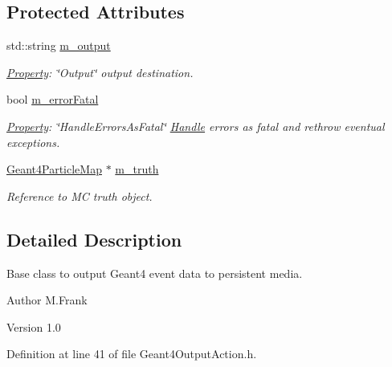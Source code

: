 \subsection*{Protected Attributes}
\begin{DoxyCompactItemize}
\item 
std::string \hyperlink{class_d_d4hep_1_1_simulation_1_1_geant4_output_action_ac3bd42351cc01a0e259cb5cc9641c6f4}{m\_\-output}
\begin{DoxyCompactList}\small\item\em \hyperlink{class_d_d4hep_1_1_property}{Property}: \char`\"{}Output\char`\"{} output destination. \item\end{DoxyCompactList}\item 
bool \hyperlink{class_d_d4hep_1_1_simulation_1_1_geant4_output_action_a7d76cce37c53f07c27f41a887fc05dbe}{m\_\-errorFatal}
\begin{DoxyCompactList}\small\item\em \hyperlink{class_d_d4hep_1_1_property}{Property}: \char`\"{}HandleErrorsAsFatal\char`\"{} \hyperlink{class_d_d4hep_1_1_handle}{Handle} errors as fatal and rethrow eventual exceptions. \item\end{DoxyCompactList}\item 
\hyperlink{class_d_d4hep_1_1_simulation_1_1_geant4_particle_map}{Geant4ParticleMap} $\ast$ \hyperlink{class_d_d4hep_1_1_simulation_1_1_geant4_output_action_ac2c6fd898ae2b43b9742cd0fb36d31c1}{m\_\-truth}
\begin{DoxyCompactList}\small\item\em Reference to MC truth object. \item\end{DoxyCompactList}\end{DoxyCompactItemize}


\subsection{Detailed Description}
Base class to output Geant4 event data to persistent media. \begin{DoxyAuthor}{Author}
M.Frank 
\end{DoxyAuthor}
\begin{DoxyVersion}{Version}
1.0 
\end{DoxyVersion}


Definition at line 41 of file Geant4OutputAction.h.

